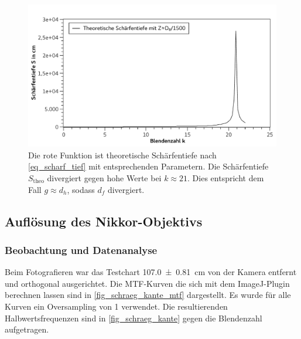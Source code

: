 \documentclass[
	a4paper,
	12pt,
	pagesize,
	ngerman
]{scrartcl}
\begin{document}
	\begin{figure}[H]  %
		\includegraphics[width=1\textwidth]{fig_scharf_tief_theo}
		\centering
		\caption{
			Die rote Funktion ist theoretische Schärfentiefe nach \cref{eq_scharf_tief} mit entsprechenden Parametern.
			Die Schärfentiefe $S_\text{theo}$ divergiert gegen hohe Werte bei $k\approx21$.
			Dies entspricht dem Fall $g\approx d_h$, sodass $d_f$ divergiert.
			}
		\label{fig_scharf_tief_theo}
		\centering
	\end{figure}



	\subsection{Auflösung des Nikkor-Objektivs}
	\subsubsection{Beobachtung und Datenanalyse}
	
	Beim Fotografieren war das Testchart \SI{107,0+-0,81}{cm} von der Kamera entfernt und orthogonal ausgerichtet.
	Die MTF-Kurven die sich mit dem ImageJ-Plugin berechnen lassen sind in \cref{fig_schraeg_kante_mtf} dargestellt. 
	Es wurde für alle Kurven ein Oversampling von 1 verwendet.
	Die resultierenden Halbwertsfrequenzen sind in \cref{fig_schraeg_kante} gegen die Blendenzahl aufgetragen.
\end{document}
